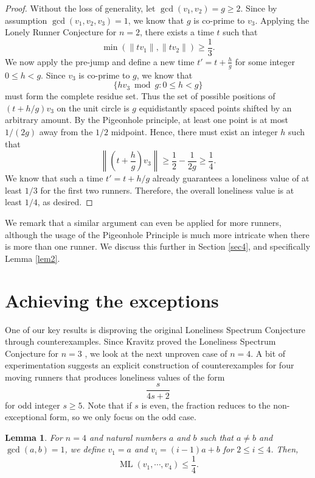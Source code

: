 \documentclass[11pt]{amsart}
\newtheorem{lemma}{Lemma}[section]
\newcommand{\norm}[1]{\lVert #1 \rVert}
\newcommand{\Norm}[1]{\left\lVert #1 \right\rVert}
\DeclareMathOperator{\ML}{ML}
\begin{document}
\begin{proof}
    Without the loss of generality, let $\gcd(v_1,v_2) = g \geq 2$. Since by assumption $\gcd(v_1,v_2,v_3) = 1$, we know that $g$ is co-prime to $v_3$. Applying the Lonely Runner Conjecture for $n = 2$, there exists a time $t$ such that
    $$\min(\norm{tv_1},\norm{tv_2}) \geq \frac{1}{3}.$$
    We now apply the pre-jump and define a new time
    $t' = t + \frac{h}{g}$
    for some integer $0 \leq h < g$. Since $v_3$ is co-prime to $g$, we know that
    $$\{hv_3 \bmod g : 0 \leq h < g\}$$ must form the 
    complete residue set. Thus the set of possible positions of $(t + h / g)v_3$ on the unit circle is $g$ equidistantly spaced points shifted by an arbitrary amount. By the Pigeonhole principle, at least one point is at most $1 / (2g)$ away from the $1 / 2$ midpoint. Hence, there must exist an integer $h$ such that
    $$\Norm{\left(t + \frac{h}{g}\right)v_3} \geq \frac{1}{2} - \frac{1}{2g} \geq \frac{1}{4}.$$
    We know that such a time $t' = t + h / g$ already guarantees a loneliness value of at least $1 / 3$ for the first two runners. Therefore, the overall loneliness value is at least $1 / 4$, as desired.
\end{proof}

\par We remark that a similar argument can even be applied for more runners, although the usage of the Pigeonhole Principle is much more intricate when there is more than one runner. We discuss this further in Section \ref{sec4}, and specifically Lemma \ref{lem2}.

\section{Achieving the exceptions}
\label{sec3}
\par One of our key results is disproving the original Loneliness Spectrum Conjecture through counterexamples. Since Kravitz proved the Loneliness Spectrum Conjecture for $n = 3$ \cite{kravitz}, we look at the next unproven case of $n = 4$. A bit of experimentation suggests an explicit construction of counterexamples for four moving runners that produces loneliness values of the form
$$\frac{s}{4s + 2}$$
for odd integer $s \geq 5$. Note that if $s$ is even, the fraction reduces to the non-exceptional form, so we only focus on the odd case.

\begin{lemma}
\label{lem6}
    For $n = 4$ and natural numbers $a$ and $b$ such that $a \neq b$ and $\gcd(a,b) = 1$, we define $v_1 = a$ and $v_i = (i - 1)a + b$ for $2 \leq i \leq 4$. Then,
    $$\ML(v_1,\cdots,v_4) \leq \frac{1}{4}.$$
\end{lemma}
\end{document}
